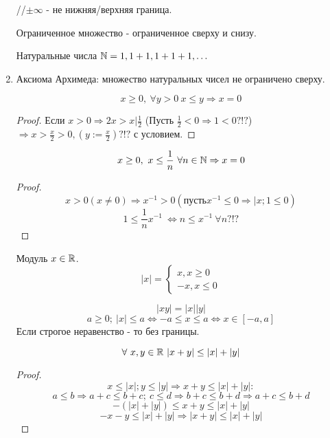 \documentclass[12pt]{report}
\begin{document}
\begin{defn}[ = Аксиоматический подход к построению $\R$]
\begin{enumerate}
\begin{defn}
//$\pm\infty$ - не нижняя/верхняя граница.

Ограниченное множество - ограниченное сверху и снизу. 
\end{defn}

\begin{defn}
Натуральные числа $\mathbb{N} = {1, 1 + 1, 1 + 1 + 1, \dots}$
\end{defn}

\item Аксиома Архимеда: множество натуральных чисел не ограничено сверху.

\begin{st}
$$x \ge 0, ~\forall y > 0 ~x\le y \Rightarrow x = 0$$
\end{st}
\begin{proof}
Если $x > 0 \Rightarrow 2x > x | \frac{1}{2}$ (Пусть $\frac{1}{2} < 0 \Rightarrow 1 < 0 ?!?$) $\Rightarrow x > \frac{x}{2} > 0, (y := \frac{x}{2})?!?$ с условием.
\end{proof}

\begin{cor}
$$x \ge 0, ~x \le \frac{1}{n} ~\forall n \in \mathbb{N} \Rightarrow x = 0$$
\end{cor}
\begin{proof}
$$x > 0 (x \neq 0) \Rightarrow x^{-1} > 0 (\mbox{пусть} x^{-1} \le 0 \Rightarrow |x; 1 \le 0)$$ 
$$1 \le \frac{1}{n}x^{-1} ~\Leftrightarrow n \le x^{-1} ~\forall n ?!?$$
\end{proof}

\begin{defn}
Модуль $ x \in \mathbb{R}$. 
$$|x| = 
\left\{
\begin{matrix}
x, x \ge 0\\
-x, x \le 0
\end{matrix}
\right.
$$
\end{defn}

\begin{note}
$$|xy| = |x||y|$$
$$a \ge 0; ~|x| \le a \Leftrightarrow -a \le x \le a \Leftrightarrow x \in [-a, a]$$
Если строгое неравенство - то без границы. 
\end{note}

\begin{st}
$$\forall ~x, y \in \mathbb{R} ~|x + y| \le |x| + |y|$$
\end{st}
\begin{proof}
$$x \le |x|; y \le |y| \Rightarrow x + y \le |x| + |y|:$$
$$a \le b \Rightarrow a + c \le b + c; ~c \le d \Rightarrow b + c \le b + d \Rightarrow a + c \le b + d$$
$$-(|x| + |y|) \le x + y \le |x| + |y|$$
$$-x - y \le |x| + |y| \Rightarrow |x + y| \le |x| + |y|$$
\end{proof}


\end{enumerate}
\end{defn}
\end{document}
